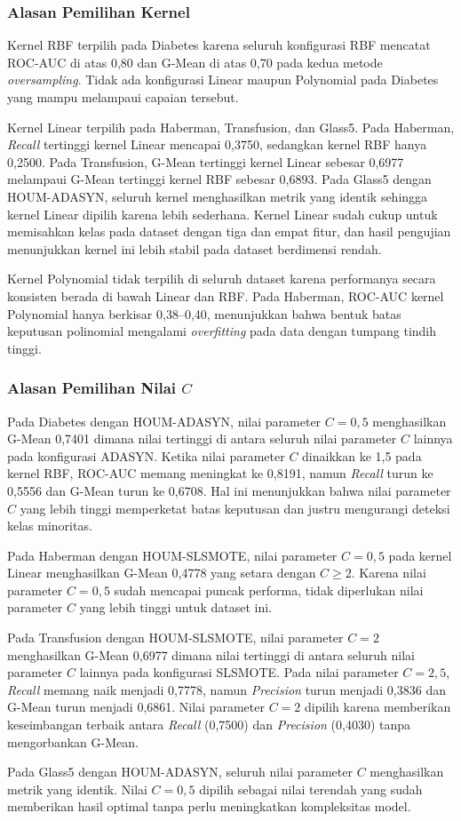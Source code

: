 \subsubsection{Alasan Pemilihan Kernel}
Kernel RBF terpilih pada Diabetes karena seluruh konfigurasi RBF mencatat ROC-AUC di atas 0,80 dan G-Mean di atas 0,70 pada kedua metode \textit{oversampling}. Tidak ada konfigurasi Linear maupun Polynomial pada Diabetes yang mampu melampaui capaian tersebut.

Kernel Linear terpilih pada Haberman, Transfusion, dan Glass5. Pada Haberman, \textit{Recall} tertinggi kernel Linear mencapai 0,3750, sedangkan kernel RBF hanya 0,2500. Pada Transfusion, G-Mean tertinggi kernel Linear sebesar 0,6977 melampaui G-Mean tertinggi kernel RBF sebesar 0,6893. Pada Glass5 dengan HOUM-ADASYN, seluruh kernel menghasilkan metrik yang identik sehingga kernel Linear dipilih karena lebih sederhana. Kernel Linear sudah cukup untuk memisahkan kelas pada dataset dengan tiga dan empat fitur, dan hasil pengujian menunjukkan kernel ini lebih stabil pada dataset berdimensi rendah.

Kernel Polynomial tidak terpilih di seluruh dataset karena performanya secara konsisten berada di bawah Linear dan RBF. Pada Haberman, ROC-AUC kernel Polynomial hanya berkisar 0,38--0,40, menunjukkan bahwa bentuk batas keputusan polinomial mengalami \textit{overfitting} pada data dengan tumpang tindih tinggi. \par

\subsubsection{Alasan Pemilihan Nilai $C$}
Pada Diabetes dengan HOUM-ADASYN, nilai parameter $C=0,5$ menghasilkan G-Mean 0,7401 dimana nilai tertinggi di antara seluruh nilai parameter $C$ lainnya pada konfigurasi ADASYN. Ketika nilai parameter $C$ dinaikkan ke 1,5 pada kernel RBF, ROC-AUC memang meningkat ke 0,8191, namun \textit{Recall} turun ke 0,5556 dan G-Mean turun ke 0,6708. Hal ini menunjukkan bahwa nilai parameter $C$ yang lebih tinggi memperketat batas keputusan dan justru mengurangi deteksi kelas minoritas.

Pada Haberman dengan HOUM-SLSMOTE, nilai parameter $C=0,5$ pada kernel Linear menghasilkan G-Mean 0,4778 yang setara dengan $C \geq 2$. Karena nilai parameter $C=0,5$ sudah mencapai puncak performa, tidak diperlukan nilai parameter $C$ yang lebih tinggi untuk dataset ini.

Pada Transfusion dengan HOUM-SLSMOTE, nilai parameter $C=2$ menghasilkan G-Mean 0,6977 dimana nilai tertinggi di antara seluruh nilai parameter $C$ lainnya pada konfigurasi SLSMOTE. Pada nilai parameter $C=2,5$, \textit{Recall} memang naik menjadi 0,7778, namun \textit{Precision} turun menjadi 0,3836 dan G-Mean turun menjadi 0,6861. Nilai parameter $C=2$ dipilih karena memberikan keseimbangan terbaik antara \textit{Recall} (0,7500) dan \textit{Precision} (0,4030) tanpa mengorbankan G-Mean.

Pada Glass5 dengan HOUM-ADASYN, seluruh nilai parameter $C$ menghasilkan metrik yang identik. Nilai $C=0,5$ dipilih sebagai nilai terendah yang sudah memberikan hasil optimal tanpa perlu meningkatkan kompleksitas model. \par